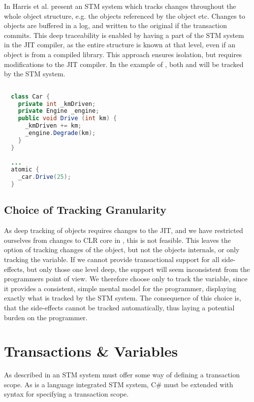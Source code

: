 In \cite{harris2003language} Harris et al. present an \ac{STM} system which tracks changes throughout the whole object structure, e.g. the objects referenced by the object etc. Changes to objects are buffered in a log, and written to the original if the transaction commits. This deep  traceability is enabled by having a part of the \ac{STM} system in the \ac{JIT} compiler, as the entire structure is known at that level, even if an object is from a compiled library. This approach ensures isolation, but requires modifications to the \ac{JIT} compiler. In the example of , both  and  will be tracked by the \ac{STM} system.
%
\begin{lstlisting}[label=lst:tracking_object,
  float,
  caption={Tracking Changes to Object},
  language=Java,  
  showspaces=false,
  showtabs=false,
  breaklines=true,
  showstringspaces=false,
  breakatwhitespace=true,
  commentstyle=\color{greencomments},
  keywordstyle=\color{bluekeywords},
  stringstyle=\color{redstrings},
  morekeywords={atomic, retry, orElse, var, get, set}]  % Start your code-block
  
  class Car {
    private int _kmDriven;
    private Engine _engine;
    public void Drive (int km) { 
      _kmDriven += km; 
      _engine.Degrade(km);
    }
  }
  
  ...
  atomic {
    _car.Drive(25);
  }
\end{lstlisting}
%
\subsection{Choice of Tracking Granularity}
As deep tracking of objects requires changes to the \ac{JIT}, and we have restricted ourselves from changes to \ac{CLR} core in , this is not feasible. This leaves the option of tracking changes of the object, but not the objects internals, or only tracking the variable. If we cannot provide transactional support for all side-effects, but only those one level deep, the support will seem inconsistent from the programmers point of view. We therefore choose only to track the variable, since it provides a consistent, simple mental model for the programmer, displaying exactly what is tracked by the \ac{STM} system. The consequence of this choice is, that the side-effects cannot be tracked automatically, thus laying a potential burden on the programmer. 

\section{Transactions \& Variables}
\label{subsec:rec_transactions_variables}
As described in  an \ac{STM} system must offer some way of defining a transaction scope. As \stmnamesp is a language integrated \ac{STM} system, C\# must be extended with syntax for specifying a transaction scope.

